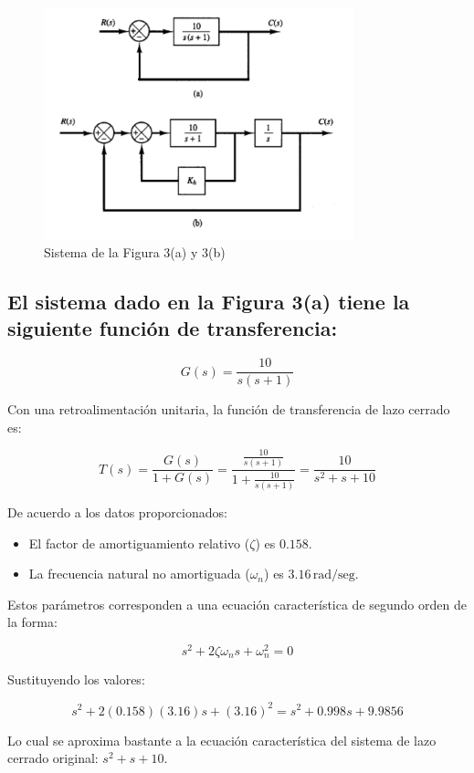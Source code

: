 \documentclass[10pt]{article}
\theoremstyle{definition}
\theoremstyle{remark}
\theoremstyle{definition}
\numberwithin{equation}{prob}
\begin{document}
\begin{figure}[h]
	\centering
	\includegraphics[width=0.8\textwidth]{./figures/Figura 3 ejercicio 5.png}
	\caption{Sistema de la Figura 3(a) y 3(b)}
\end{figure}


\subsection{El sistema dado en la Figura 3(a) tiene la siguiente función de transferencia:}

\[
	G(s) = \frac{10}{s(s + 1)}
\]

Con una retroalimentación unitaria, la función de transferencia de lazo cerrado es:

\[
	T(s) = \frac{G(s)}{1 + G(s)} = \frac{\frac{10}{s(s+1)}}{1 + \frac{10}{s(s+1)}} = \frac{10}{s^2 + s + 10}
\]

De acuerdo a los datos proporcionados:

\begin{itemize}
	\item El factor de amortiguamiento relativo (\(\zeta\)) es \(0.158\).
	\item La frecuencia natural no amortiguada (\(\omega_n\)) es \(3.16 \, \text{rad/seg}\).
\end{itemize}

Estos parámetros corresponden a una ecuación característica de segundo orden de la forma:

\[
	s^2 + 2\zeta \omega_n s + \omega_n^2 = 0
\]

Sustituyendo los valores:

\[
	s^2 + 2(0.158)(3.16)s + (3.16)^2 = s^2 + 0.998s + 9.9856
\]

Lo cual se aproxima bastante a la ecuación característica del sistema de lazo cerrado original: \(s^2 + s + 10\).
\end{document}
